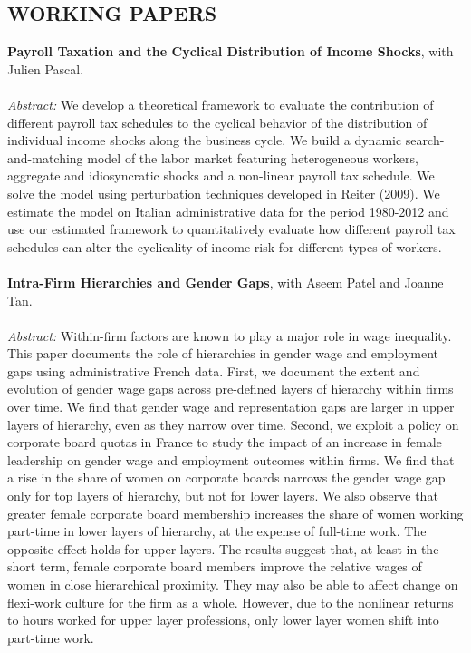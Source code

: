 \documentclass{res}
\begin{document}
\begin{resume}
\section{\small WORKING PAPERS}
   \vspace{5pt}
\textbf{Payroll Taxation and the Cyclical Distribution of Income Shocks}, with Julien Pascal. \\
\\
 \textit{Abstract:} We develop a theoretical framework to evaluate the contribution of different payroll tax schedules to the cyclical behavior of the distribution of individual income shocks along the business cycle. We build a dynamic search-and-matching model of the labor market featuring heterogeneous workers, aggregate and idiosyncratic shocks and a non-linear payroll tax schedule. We solve the model using perturbation techniques developed in Reiter (2009). We estimate the model on Italian administrative data for the period 1980-2012 and use our estimated framework to quantitatively evaluate how different payroll tax schedules can alter the cyclicality of income risk for different types of workers. \\
\\
\textbf{Intra-Firm Hierarchies and Gender Gaps}, with Aseem Patel and Joanne Tan. \\
\\   
\textit{Abstract:} Within-firm factors are known to play a major role in wage inequality. This paper documents the role of hierarchies in gender wage and employment gaps using administrative French data. First, we document the extent and evolution of gender wage gaps across pre-defined layers of hierarchy within firms over time. We find that gender wage and representation gaps are larger in upper layers of hierarchy, even as they narrow over time. Second, we exploit a policy on corporate board quotas in France to study the impact of an increase in female leadership on gender wage and employment outcomes within firms. We find that a rise in the share of women on corporate boards narrows the gender wage gap only for top layers of hierarchy, but not for lower layers. We also observe that greater female corporate board membership increases the share of women working part-time in lower layers of hierarchy, at the expense of full-time work. The opposite effect holds for upper layers. The results suggest that, at least in the short term, female corporate board members improve the relative wages of women in close hierarchical proximity. They may also be able to affect change on flexi-work culture for the firm as a whole. However, due to the nonlinear returns to hours worked for upper layer professions, only lower layer women shift into part-time work. \\

\end{resume}
\end{document}
